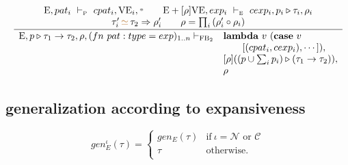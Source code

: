 \documentclass[11pt,a4paper]{article}
\newcommand{\key}[1]{\textrm{\textbf{#1}}}
\newcommand{\qualtype}[2]{#1 \triangleright #2}
\newcommand{\unify}[3]{#1\,{\color{brown}{\simeq}}\,#2 \Rightarrow #3}
\newcommand{\wildcard}{{\color{gray}\scriptstyle\textbf{*}}}
\newcommand{\compose}[2]{#1 \circ #2}
\newcommand{\Env}  {\textrm{E}}
\newcommand{\VE}   {\textrm{VE}}
\newcommand{\FB}   {\textrm{FB}}
\newcommand{\vdashE}  {\ \vdash_{\textrm{\tiny E}}\  }
\newcommand{\vdashP}  {\ \vdash_{\textrm{\tiny P}}\  }
\newcommand{\xpc}{\mathcal{C}}
\newcommand{\nxp}{\mathcal{N}}
\begin{document}
\[
\cfrac
 {\begin{array}{c}
  \Env,pat_i \vdashP cpat_i,\VE_i,\wildcard \qquad
  \Env+[\rho]\VE, exp_i \vdashE cexp_i,\qualtype{p_i}{\tau_i},\rho_i \\
  \unify{\tau_i'}{\tau_2}{\rho_i'} \qquad 
  \rho = \prod_i{(\compose{\rho_i'}{\rho_i})} \\
  \end{array}
 }
 {\begin{array}{ll}
  \Env,\qualtype{p}{\tau_1\to\tau_2},\rho,(fn\ pat:type = exp)_{1..n} \vdash_{\FB_2}
   & \key{lambda}\ v\ (\key{case}\ v    \\
   & \qquad [(cpat_i, cexp_i),\cdots]), \\
   & [\rho](\qualtype{(p\cup\sum_i p_i)}{(\tau_1\to\tau_2)}), \\
   & \rho \\
  \end{array}}
\]

\subsection {generalization according to expansiveness}
\[ 
	gen_E^\iota(\tau) = \left\{\begin{array}{cl}
						gen_E(\tau)	& \textrm{if}\ \iota = \nxp \textrm{ or } \xpc \\
						\tau		& \textrm{otherwise.}				\\
						\end{array}\right.
\]
\end{document}
